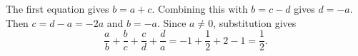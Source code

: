 The first equation gives $b=a+c$. Combining this with $b=c-d$ gives $d=-a$. Then $c=d-a=-2a$ and $b=-a$. Since $a\ne0$, substitution gives
\[
\dfrac{a}{b}+\dfrac{b}{c}+\dfrac{c}{d}+\dfrac{d}{a}
=-1+\dfrac{1}{2}+2-1=\boxed{\dfrac{1}{2}}.
\]

